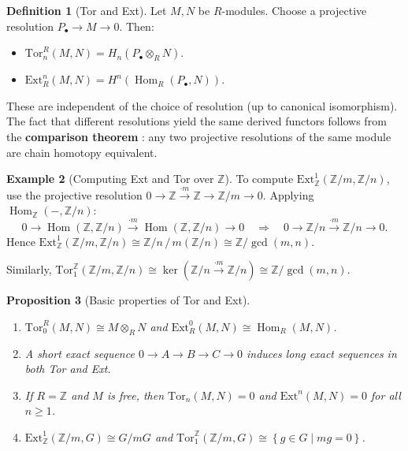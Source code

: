 \documentclass[12pt,a4paper,openany]{book}
\theoremstyle{definition}
\newtheorem{definition}{Definition}[chapter]
\newtheorem{example}[definition]{Example}
\theoremstyle{plain}
\newtheorem{proposition}[definition]{Proposition}
\theoremstyle{remark}
\newcommand{\Z}{\mathbb{Z}}
\DeclareMathOperator{\Hom}{Hom}
\newcommand{\set}[1]{\left\{#1\right\}}
\begin{document}
\begin{definition}[Tor and Ext]
Let $M,N$ be $R$-modules.  Choose a projective resolution
$P_\bullet\to M\to 0$.  Then:
\begin{itemize}
  \item $\mathrm{Tor}_n^R(M,N) = H_n(P_\bullet\otimes_R N)$.
  \item $\mathrm{Ext}^n_R(M,N) = H^n(\Hom_R(P_\bullet,N))$.
\end{itemize}
These are independent of the choice of resolution (up to canonical
isomorphism).  The fact that different resolutions yield the same
derived functors follows from the \textbf{comparison theorem}%
: any two projective resolutions of the same
module are chain homotopy equivalent.
\end{definition}

\begin{example}[Computing Ext and Tor over $\Z$]
To compute $\mathrm{Ext}^1_\Z(\Z/m,\Z/n)$, use the projective
resolution $0\to\Z\xrightarrow{\cdot m}\Z\to\Z/m\to 0$.  Applying
$\Hom_\Z(-,\Z/n)$:
\[
  0\to\Hom(\Z,\Z/n)\xrightarrow{\cdot m}\Hom(\Z,\Z/n)\to 0
  \quad\Longrightarrow\quad
  0\to\Z/n\xrightarrow{\cdot m}\Z/n\to 0.
\]
Hence $\mathrm{Ext}^1_\Z(\Z/m,\Z/n)\cong\Z/n\,/\,m(\Z/n)\cong
\Z/\gcd(m,n)$.

Similarly, $\mathrm{Tor}_1^\Z(\Z/m,\Z/n)\cong\ker(\Z/n\xrightarrow
{\cdot m}\Z/n)\cong\Z/\gcd(m,n)$.
\end{example}

\begin{proposition}[Basic properties of Tor and Ext]
\begin{enumerate}[label=(\roman*)]
  \item $\mathrm{Tor}_0^R(M,N)\cong M\otimes_R N$ and
    $\mathrm{Ext}^0_R(M,N)\cong\Hom_R(M,N)$.
  \item A short exact sequence $0\to A\to B\to C\to0$ induces long
    exact sequences in both Tor and Ext.
  \item If $R=\Z$ and $M$ is free, then $\mathrm{Tor}_n(M,N)=0$ and
    $\mathrm{Ext}^n(M,N)=0$ for all $n\ge1$.
  \item $\mathrm{Ext}^1_\Z(\Z/m,G)\cong G/mG$ and
    $\mathrm{Tor}_1^\Z(\Z/m,G)\cong\set{g\in G\mid mg=0}$.
\end{enumerate}
\end{proposition}
\end{document}
